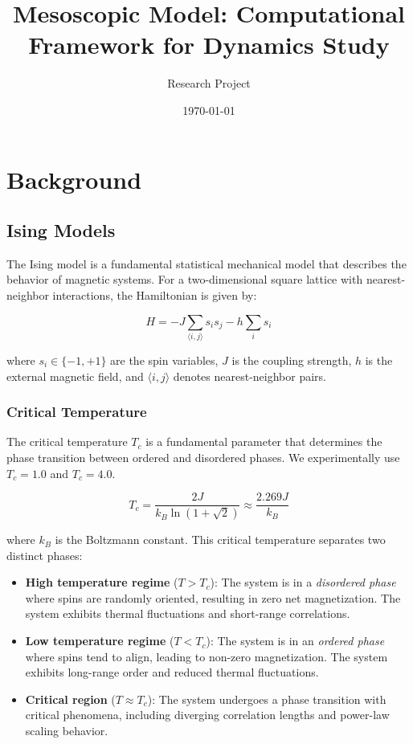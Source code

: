 \documentclass[11pt,a4paper]{article}
\title{Mesoscopic Model: Computational Framework for Dynamics Study}
\author{Research Project}
\date{\today}
\begin{document}
\maketitle

\tableofcontents
\newpage

\section{Background}

\subsection{Ising Models}

The Ising model is a fundamental statistical mechanical model that describes the behavior of magnetic systems. For a two-dimensional square lattice with nearest-neighbor interactions, the Hamiltonian is given by:

\begin{equation}
H = -J \sum_{\langle i,j \rangle} s_i s_j - h \sum_i s_i
\end{equation}

where $s_i \in \{-1, +1\}$ are the spin variables, $J$ is the coupling strength, $h$ is the external magnetic field, and $\langle i,j \rangle$ denotes nearest-neighbor pairs.

\subsubsection{Critical Temperature}

The critical temperature $T_c$ is a fundamental parameter that determines the phase transition between ordered and disordered phases. We experimentally use $T_c = 1.0$ and $T_c = 4.0$.

\begin{equation}
T_c = \frac{2J}{k_B \ln(1 + \sqrt{2})} \approx \frac{2.269J}{k_B}
\end{equation}

where $k_B$ is the Boltzmann constant. This critical temperature separates two distinct phases:

\begin{itemize}
    \item \textbf{High temperature regime} ($T > T_c$): The system is in a \textit{disordered phase} where spins are randomly oriented, resulting in zero net magnetization. The system exhibits thermal fluctuations and short-range correlations.
    
    \item \textbf{Low temperature regime} ($T < T_c$): The system is in an \textit{ordered phase} where spins tend to align, leading to non-zero magnetization. The system exhibits long-range order and reduced thermal fluctuations.
    
    \item \textbf{Critical region} ($T \approx T_c$): The system undergoes a phase transition with critical phenomena, including diverging correlation lengths and power-law scaling behavior.
\end{itemize}
\end{document}
